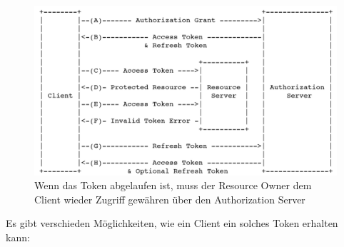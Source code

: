 \documentclass[a4paper, 11pt]{article}
\begin{document}
\begin{figure}[htb]
	\centering
	\includegraphics[keepaspectratio=true,height=15\baselineskip]{OAuth_Refresh.PNG}
	\caption{Wenn das Token abgelaufen ist, muss der Resource Owner dem Client wieder Zugriff gewähren über den Authorization Server}
	\label{fig:oauth-refresh}
\end{figure}

\newpage

\noindent Es gibt verschieden Möglichkeiten, wie ein Client ein solches Token erhalten kann:
\end{document}
